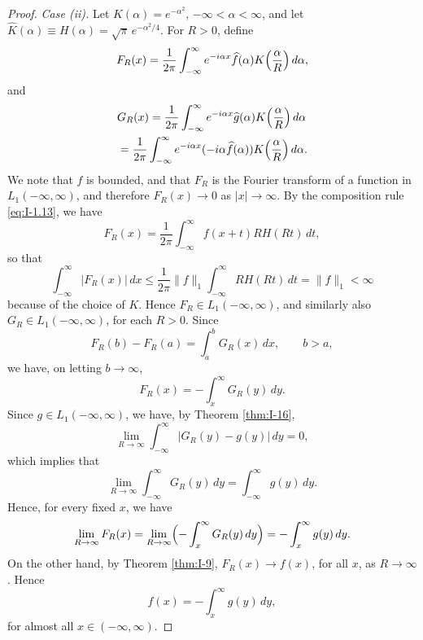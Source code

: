 \begin{proof}
\emph{Case (ii).} Let $K(\alpha)=e^{-\alpha^{2}}$, $-\infty<\alpha<\infty$, and let $\hat K(\alpha)\equiv H(\alpha)=\sqrt{\pi}\,e^{-\alpha^{2}/4}$. For $R>0$, define
\begin{equation*}
F_R(x)=\frac{1}{2\pi}\int_{-\infty}^{\infty}e^{-i\alpha x}\widehat f(\alpha)K\Bigl(\frac{\alpha}{R}\Bigr)\,d\alpha,
\end{equation*}
and
\begin{equation*}
\begin{aligned}
&G_R(x) = \frac{1}{2\pi}  \int_{-\infty}^{\infty}e^{-i\alpha x}\widehat g(\alpha)K  \Bigl(\frac{\alpha}{R}\Bigr)\,d\alpha\\
&= \frac{1}{2\pi}  \int_{-\infty}^{\infty}e^{-i\alpha x}(-i\alpha\widehat f(\alpha))K  \Bigl(\frac{\alpha}{R}\Bigr)\,d\alpha.
\end{aligned}
\end{equation*}
We note that $\widehat f$ is bounded, and that $F_R$ is the Fourier transform of a function in $L_1(-\infty,\infty)$, and therefore $F_R(x)\to 0$ as $|x|\to\infty$. By the composition rule \eqref{eq:I-1.13}, we have
\begin{equation*}
F_R(x)=\frac{1}{2\pi}\int_{-\infty}^{\infty}f(x+t)RH(Rt)\,dt,
\end{equation*}
so that
\begin{equation}\label{eq:I-9.9}\tag{9.9}
\int_{-\infty}^{\infty}|F_R(x)|\,dx
\le\frac{1}{2\pi}\|f\|_1\int_{-\infty}^{\infty}RH(Rt)\,dt
=\|f\|_1<\infty
\end{equation}
because of the choice of $K$. Hence $F_R\in L_1(-\infty,\infty)$, and similarly also $G_R\in L_1(-\infty,\infty)$, for each $R>0$. Since
\begin{equation*}
F_R(b)-F_R(a)=\int_{a}^{b}G_R(x)\,dx,\qquad b>a,
\end{equation*}
we have, on letting $b\to\infty$,
\begin{equation*}
F_R(x)=-\int_{x}^{\infty}G_R(y)\,dy.
\end{equation*}
Since $g\in L_1(-\infty,\infty)$, we have, by Theorem \ref{thm:I-16},
\begin{equation*}
\lim_{R\to\infty}\int_{-\infty}^{\infty}|G_R(y)-g(y)|\,dy=0,
\end{equation*}
which implies that
\begin{equation*}
\lim_{R\to\infty}\int_{-\infty}^{\infty}G_R(y)\,dy=\int_{-\infty}^{\infty}g(y)\,dy.
\end{equation*}
Hence, for every fixed $x$, we have
\begin{equation*}
\lim_{R\to\infty}F_R(x)=\lim_{R\to\infty}\Bigl(-\int_{x}^{\infty}G_R(y)\,dy\Bigr)=-\int_{x}^{\infty}g(y)\,dy.
\end{equation*}
On the other hand, by Theorem \ref{thm:I-9}, $F_R(x)\to f(x)$, for all $x$, as $R\to\infty$. Hence
\begin{equation*}
f(x)=-\int_{x}^{\infty}g(y)\,dy,
\end{equation*}
for almost all $x\in(-\infty,\infty)$.
\end{proof}

